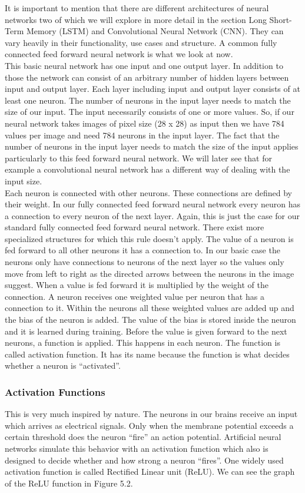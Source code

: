 \documentclass[a4paper,12pt]{report}
\begin{document}
	
	It is important to mention that there are different architectures of neural networks two of which we will explore in more detail in the section Long Short-Term Memory (LSTM) and Convolutional Neural Network (CNN). They can vary heavily in their functionality, use cases and structure. A common fully connected feed forward neural network is what we look at now.\\
	
	This basic neural network has one input and one output layer. In addition to those the network can consist of an arbitrary number of hidden layers between input and output layer. Each layer including input and output layer consists of at least one neuron. The number of neurons in the input layer needs to match the size of our input. The input necessarily consists of one or more values. So, if our neural network takes images of pixel size (28 x 28) as input then we have 784 values per image and need 784 neurons in the input layer. The fact that the number of neurons in the input layer needs to match the size of the input applies particularly to this feed forward neural network. We will later see that for example a convolutional neural network has a different way of dealing with the input size. \\
	
	Each neuron is connected with other neurons. These connections are defined by their weight. In our fully connected feed forward neural network every neuron has a connection to every neuron of the next layer. Again, this is just the case for our standard fully connected feed forward neural network. There exist more specialized structures for which this rule doesn’t apply. The value of a neuron is fed forward to all other neurons it has a connection to. In our basic case the neurons only have connections to neurons of the next layer so the values only move from left to right as the directed arrows between the neurons in the image suggest. When a value is fed forward it is multiplied by the weight of the connection. A neuron receives one weighted value per neuron that has a connection to it. Within the neurons all these weighted values are added up and the bias of the neuron is added. The value of the bias is stored inside the neuron and it is learned during training. Before the value is given forward to the next neurons, a function is applied. This happens in each neuron. The function is called activation function. It has its name because the function is what decides whether a neuron is “activated”.\\
	\subsubsection{Activation Functions}
	This is very much inspired by nature. The neurons in our brains receive an input which arrives as electrical signals. Only when the membrane potential exceeds a certain threshold does the neuron “fire” an action potential. Artificial neural networks simulate this behavior with an activation function which also is designed to decide whether and how strong a neuron “fires”. One widely used activation function is called Rectified Linear unit (ReLU). We can see the graph of the ReLU function in Figure 5.2.
	
\end{document}
